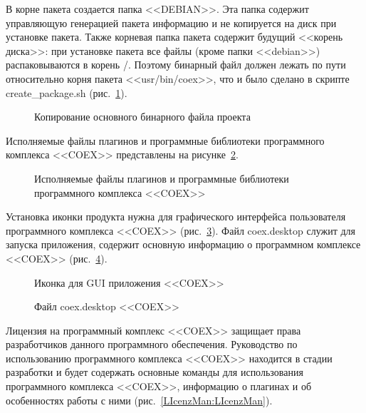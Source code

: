 В корне пакета создается папка <<DEBIAN>>. Эта папка содержит управляющую генерацией пакета информацию и не копируется на диск при установке пакета.
Также корневая папка пакета содержит будущий <<корень диска>>: при установке пакета все файлы (кроме папки <<debian>>) распаковываются в корень /. Поэтому бинарный файл должен лежать по пути относительно корня пакета <<usr/bin/coex>>, что и было сделано в скрипте create\_package.sh (рис.~\ref{cpcoex:cpcoex}). 

\begin{figure}[h!]
\caption{Копирование основного бинарного файла проекта}
\label{cpcoex:cpcoex}
\end{figure}

Исполняемые файлы плагинов и программные библиотеки программного комплекса <<COEX>> представлены на рисунке~\ref{PluginsAndLibs:PluginsAndLibs}.

\begin{figure}[h!]
\caption{Исполняемые файлы плагинов и программные библиотеки программного комплекса <<COEX>>}
\label{PluginsAndLibs:PluginsAndLibs}
\end{figure}

Установка иконки продукта нужна для графического интерфейса пользователя программного комплекса <<COEX>> (рис.~\ref{image:image}). Файл coex.desktop служит для запуска приложения, содержит основную информацию о программном комплексе <<COEX>> (рис.~\ref{Aplicatio:Aplicatio}).

\begin{figure}[h!]
\caption{ Иконка для GUI приложения <<COEX>> }
\label{image:image}
\end{figure}


\begin{figure}[h!]
\caption{ Файл coex.desktop <<COEX>> }
\label{Aplicatio:Aplicatio}
\end{figure}

Лицензия на программный комплекс <<COEX>> защищает права разработчиков данного программного обеспечения. Руководство по использованию программного комплекса <<COEX>> находится в стадии разработки и будет содержать основные команды для использования программного комплекса <<COEX>>, информацию о плагинах и об особенностях работы с ними (рис.~\ref{LIcenzMan:LIcenzMan}).

